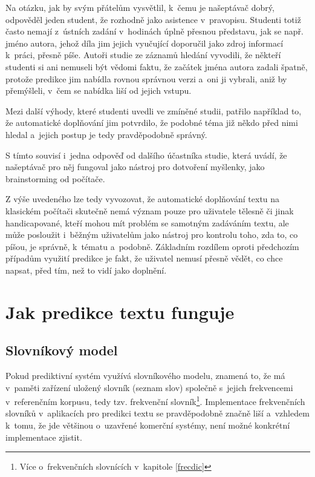 \documentclass[a4paper,11pt,openany]{book} %
\begin{document}
Na otázku, jak by svým přátelům vysvětlil, k~čemu je našeptávač dobrý, odpověděl jeden student, že rozhodně jako asistence v~pravopisu. Studenti totiž často nemají z~ústních zadání v~hodinách úplně přesnou představu, jak se např. jméno autora, jehož díla jim jejich vyučující doporučil jako zdroj informací k~práci, přesně píše. Autoři studie ze záznamů hledání vyvodili, že někteří studenti si ani nemuseli být vědomi faktu, že začátek jména autora zadali špatně, protože predikce jim nabídla rovnou správnou verzi a~oni ji vybrali, aniž by přemýšleli, v~čem se nabídka liší od jejich vstupu. 

Mezi další výhody, které studenti uvedli ve zmíněné studii, patřilo například to, že automatické doplňování jim potvrdilo, že podobné téma již někdo před nimi hledal a~jejich postup je tedy pravděpodobně správný. 

S tímto souvisí i~jedna odpověď od dalšího účastníka studie, která uvádí, že našeptávač pro něj fungoval jako nástroj pro dotvoření myšlenky, jako brainstorming od počítače. 

Z výše uvedeného lze tedy vyvozovat, že automatické doplňování textu na klasickém počítači skutečně nemá význam pouze pro uživatele tělesně či jinak handicapované, kteří mohou mít problém se samotným zadáváním textu, ale může posloužit i~běžným uživatelům jako nástroj pro kontrolu toho, zda to, co píšou, je správně, k~tématu a~podobně. Základním rozdílem oproti předchozím případům využití predikce je fakt, že uživatel nemusí přesně vědět, co chce napsat, před tím, než to vidí jako doplnění.

\chapter{Jak predikce textu funguje}

\section{Slovníkový model}

Pokud prediktivní systém využívá slovníkového modelu, znamená to, že má v~paměti zařízení uložený slovník (seznam slov) společně s~jejich frekvencemi v~referenčním korpusu, tedy tzv. frekvenční slovník\footnote{Více o~frekvenčních slovnících v~kapitole \ref{frecdic}}. %
Implementace frekvenčních slovníků v~aplikacích pro predikci textu se pravděpodobně značně liší a~vzhledem k~tomu, že jde většinou o~uzavřené komerční systémy, není možné konkrétní implementace zjistit. \parencite{alanhenry2014}
\end{document}
